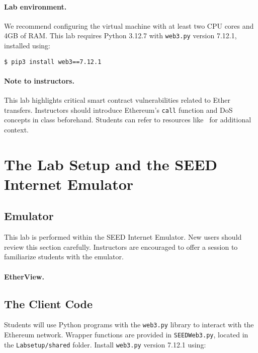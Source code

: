 \paragraph{Lab environment.}
\seedenvironmentB
\nodependency
We recommend configuring the virtual machine with at least two CPU cores and 4GB of RAM. This lab requires Python 3.12.7 with \texttt{web3.py} version 7.12.1, installed using:

\begin{lstlisting}
$ pip3 install web3==7.12.1
\end{lstlisting}

\paragraph{Note to instructors.}
This lab highlights critical smart contract vulnerabilities related to Ether transfers. Instructors should introduce Ethereum’s \texttt{call} function and DoS concepts in class beforehand. Students can refer to resources like~\cite{CyfrinDoS} for additional context.

\section{The Lab Setup and the SEED Internet Emulator}
\label{sec:labsetup}

\subsection{Emulator}

This lab is performed within the SEED Internet Emulator. New users should review this section carefully. Instructors are encouraged to offer a session to familiarize students with the emulator.



\paragraph{EtherView.}


\subsection{The Client Code}

Students will use Python programs with the \texttt{web3.py} library to interact with the Ethereum network. Wrapper functions are provided in \texttt{SEEDWeb3.py}, located in the \texttt{Labsetup/shared} folder. Install \texttt{web3.py} version 7.12.1 using:

